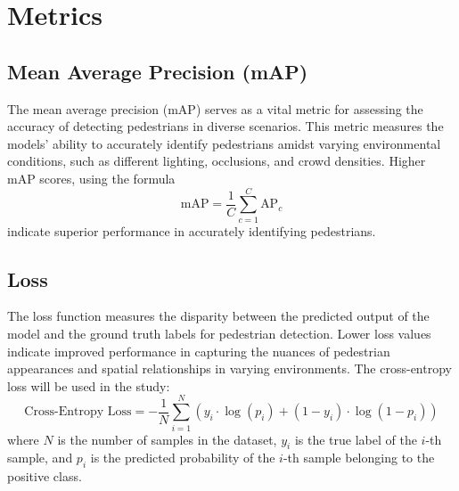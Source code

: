 \section{Metrics}
\subsection{Mean Average Precision (mAP)}
The mean average precision (mAP) serves as a vital metric for assessing the accuracy of detecting pedestrians in diverse scenarios. This metric measures the models' ability to accurately identify pedestrians amidst varying environmental conditions, such as different lighting, occlusions, and crowd densities. Higher mAP scores, using the formula
\[\text{mAP} = \frac{1}{C} \sum_{c=1}^{C} \text{AP}_c\]
indicate superior performance in accurately identifying pedestrians.

\subsection{Loss}
The loss function measures the disparity between the predicted output of the model and the ground truth labels for pedestrian detection. Lower loss values indicate improved performance in capturing the nuances of pedestrian appearances and spatial relationships in varying environments. The cross-entropy loss will be used in the study:
\[\text{Cross-Entropy Loss} = - \frac{1}{N} \sum_{i=1}^{N} \left( y_i \cdot \log(p_i) + (1 - y_i) \cdot \log(1 - p_i) \right)\]
where \(N\) is the number of samples in the dataset, \(y_i\) is the true label of the \(i\)-th sample, and \(p_i\) is the predicted probability of the \(i\)-th sample belonging to the positive class.